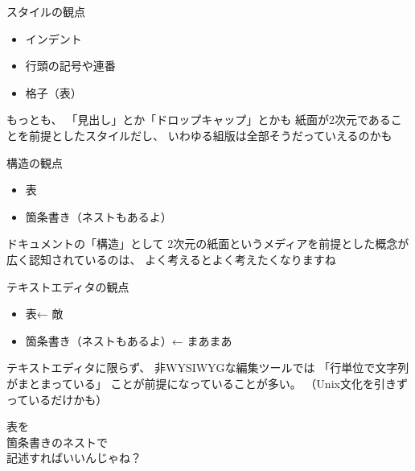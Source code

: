 \documentclass[14pt,dvipdfmx,uplatex]{beamer}
\begin{document}
\begin{frame}[t]{\inhibitglue スタイルの観点}
  \sffamily
  \begin{itemize}
  \item インデント
  \item 行頭の記号や連番
  \item 格子（表）
  \end{itemize}

  \vfill\footnotesize

  もっとも、
  「見出し」とか「ドロップキャップ」とかも
  紙面が2次元であることを前提としたスタイルだし、
  いわゆる組版は全部そうだっていえるのかも
  
\end{frame}

\begin{frame}[t]{\inhibitglue 構造の観点}
  \sffamily
  \begin{itemize}
  \item 表
  \item 箇条書き（ネストもあるよ）
  \end{itemize}

  \vfill\footnotesize

  ドキュメントの「構造」として
  2次元の紙面というメディアを前提とした概念が広く認知されているのは、
  よく考えるとよく考えたくなりますね
  
\end{frame}

\begin{frame}[t]{\inhibitglue テキストエディタの観点}
  \sffamily
  \begin{itemize}
  \item 表←{\color{shozyohi} 敵}
  \item 箇条書き（ネストもあるよ）←{\color{rurikon} まあまあ}
  \end{itemize}

  \vfill\footnotesize

  テキストエディタに限らず、
  非WYSIWYGな編集ツールでは
  「行単位で文字列がまとまっている」
  ことが前提になっていることが多い。
  （Unix文化を引きずっているだけかも）
  
\end{frame}

\begin{frame}[plain]
  \begin{center}
    \color{kachi}\yasagoth
    表を\\
    箇条書きのネストで\\
    記述すればいいんじゃね？
  \end{center}
\end{frame}
\end{document}
